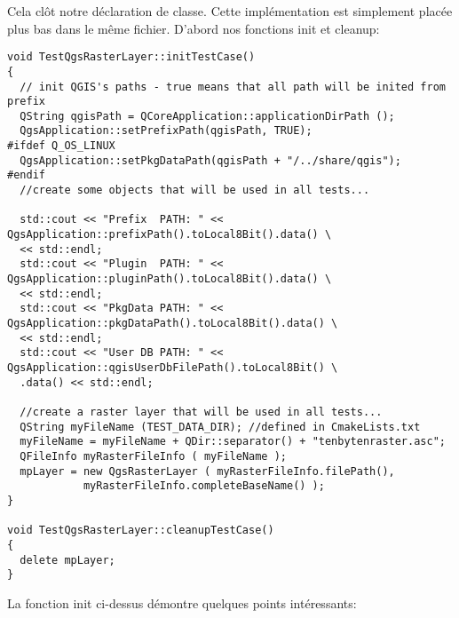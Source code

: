 Cela cl\^ot notre d\'eclaration de classe. Cette impl\'ementation est simplement plac\'ee plus bas dans le m\^eme fichier. D'abord nos fonctions init et cleanup:

\begin{verbatim}
void TestQgsRasterLayer::initTestCase()
{
  // init QGIS's paths - true means that all path will be inited from prefix
  QString qgisPath = QCoreApplication::applicationDirPath ();
  QgsApplication::setPrefixPath(qgisPath, TRUE);
#ifdef Q_OS_LINUX
  QgsApplication::setPkgDataPath(qgisPath + "/../share/qgis");
#endif
  //create some objects that will be used in all tests...

  std::cout << "Prefix  PATH: " << QgsApplication::prefixPath().toLocal8Bit().data() \
  << std::endl;
  std::cout << "Plugin  PATH: " << QgsApplication::pluginPath().toLocal8Bit().data() \
  << std::endl;
  std::cout << "PkgData PATH: " << QgsApplication::pkgDataPath().toLocal8Bit().data() \
  << std::endl;
  std::cout << "User DB PATH: " << QgsApplication::qgisUserDbFilePath().toLocal8Bit() \
  .data() << std::endl;

  //create a raster layer that will be used in all tests...
  QString myFileName (TEST_DATA_DIR); //defined in CmakeLists.txt
  myFileName = myFileName + QDir::separator() + "tenbytenraster.asc";
  QFileInfo myRasterFileInfo ( myFileName );
  mpLayer = new QgsRasterLayer ( myRasterFileInfo.filePath(),
            myRasterFileInfo.completeBaseName() );
}

void TestQgsRasterLayer::cleanupTestCase()
{
  delete mpLayer;
}

\end{verbatim}

% 
La fonction init ci-dessus d\'emontre quelques points int\'eressants:

